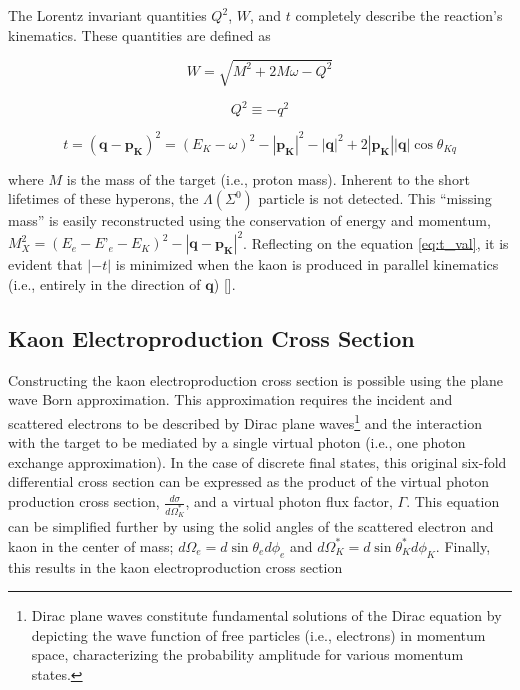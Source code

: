 \documentclass[
]{report}
\begin{document}
The Lorentz invariant quantities \(Q^2\), \(W\), and \(t\) completely
describe the reaction's kinematics. These quantities are defined as

\begin{equation} 
    W=\sqrt{M^2+2M\omega-Q^2}
  \label{eq:w_val} 
\end{equation}

\begin{equation} 
    Q^2\equiv-q^2
  \label{eq:q2_val} 
\end{equation}

\begin{equation} 
    t=(\mathbf{q}-\mathbf{p_{K}})^2=(E_K-\omega)^2-|\mathbf{p_{K}}|^2-|\mathbf{q}|^2+2|\mathbf{p_{K}}||\mathbf{q}|\cos{\theta_{Kq}}
  \label{eq:t_val} 
\end{equation}

\noindent where \(M\) is the mass of the target (i.e., proton mass).
Inherent to the short lifetimes of these hyperons, the
\(\Lambda(\Sigma^0)\) particle is not detected. This ``missing mass'' is
easily reconstructed using the conservation of energy and momentum,
\(M_{X}^2=(E_e-E’_e-E_K)^2-|\mathbf{q}-\mathbf{p_{K}}|^2\). Reflecting
on the equation \ref{eq:t_val}, it is evident that \(|-t|\) is minimized
when the kaon is produced in parallel kinematics (i.e., entirely in the
direction of \(\mathbf{q}\))
{[}\cite{pannunzio_carmignotto_exploring_2017}{]}.

\hypertarget{kaon-electroproduction-cross-section}{%
\subsection{Kaon Electroproduction Cross
Section}\label{kaon-electroproduction-cross-section}}

Constructing the kaon electroproduction cross section is possible using
the plane wave Born approximation. This approximation requires the
incident and scattered electrons to be described by Dirac plane
waves\footnote{Dirac plane waves constitute fundamental solutions of the Dirac equation by depicting the wave function of free particles (i.e., electrons) in momentum space, characterizing the probability amplitude for various momentum states.}
and the interaction with the target to be mediated by a single virtual
photon (i.e., one photon exchange approximation). In the case of
discrete final states, this original six-fold differential cross section
can be expressed as the product of the virtual photon production cross
section, \(\frac{d\sigma}{d\Omega_{K}^*}\), and a virtual photon flux
factor, \(\Gamma\). This equation can be simplified further by using the
solid angles of the scattered electron and kaon in the center of mass;
\(d\Omega_e=d\sin{\theta_e}d\phi_e\) and
\(d\Omega_{K}^*=d\sin{\theta_{K}^*}d\phi_{K}\). Finally, this results in
the kaon electroproduction cross section
\end{document}
